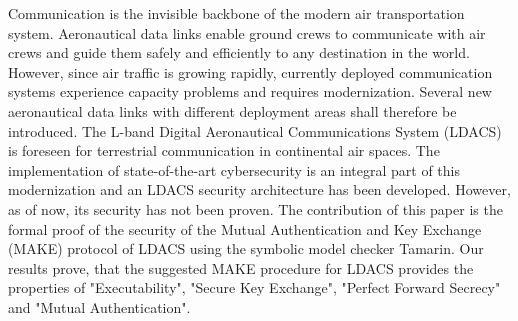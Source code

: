 Communication is the invisible backbone of the modern air transportation system. Aeronautical data links enable ground crews to communicate with air crews and guide them safely and efficiently to any destination in the world. However, since air traffic is growing rapidly, currently deployed communication systems experience capacity problems and requires modernization. Several new aeronautical data links with different deployment areas shall therefore be introduced. The L-band Digital Aeronautical Communications System (LDACS) is foreseen for terrestrial communication in continental air spaces. The implementation of state-of-the-art cybersecurity is an integral part of this modernization and an LDACS security architecture has been developed. However, as of now, its security has not been proven. The contribution of this paper is the formal proof of the security of the Mutual Authentication and Key Exchange (MAKE) protocol of LDACS using the symbolic model checker Tamarin. Our results prove, that the suggested MAKE procedure for LDACS provides the properties of "Executability", "Secure Key Exchange", "Perfect Forward Secrecy" and "Mutual Authentication".